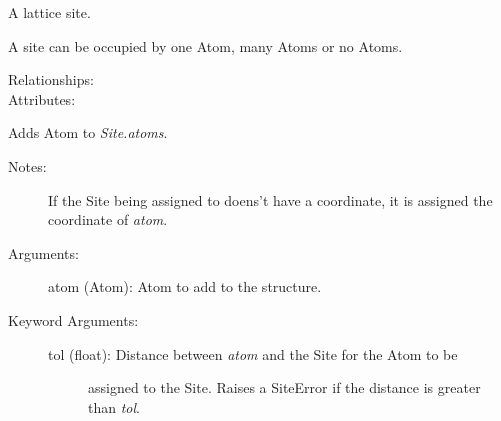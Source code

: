 \documentclass[letterpaper,10pt,english]{sphinxmanual}
\begin{document}
\begin{fulllineitems}
\label{models:qmpy.Site}
A lattice site.

A site can be occupied by one Atom, many Atoms or no Atoms.
\begin{description}
\item[{Relationships:}] \leavevmode
{}

\item[{Attributes:}] \leavevmode
{}

\end{description}

\begin{fulllineitems}
\label{models:qmpy.Site.add_atom}
Adds Atom to \emph{Site.atoms}.
\begin{description}
\item[{Notes:}] \leavevmode
If the Site being assigned to doens't have a coordinate, it is assigned
the coordinate of \emph{atom}.

\item[{Arguments:}] \leavevmode
atom (Atom): Atom to add to the structure.

\item[{Keyword Arguments:}] \leavevmode\begin{description}
\item[{tol (float): Distance between \emph{atom} and the Site for the Atom to be }] \leavevmode
assigned to the Site. Raises a SiteError if the distance is 
greater than \emph{tol}.

\end{description}


\end{description}
\end{fulllineitems}
\end{fulllineitems}
\end{document}
